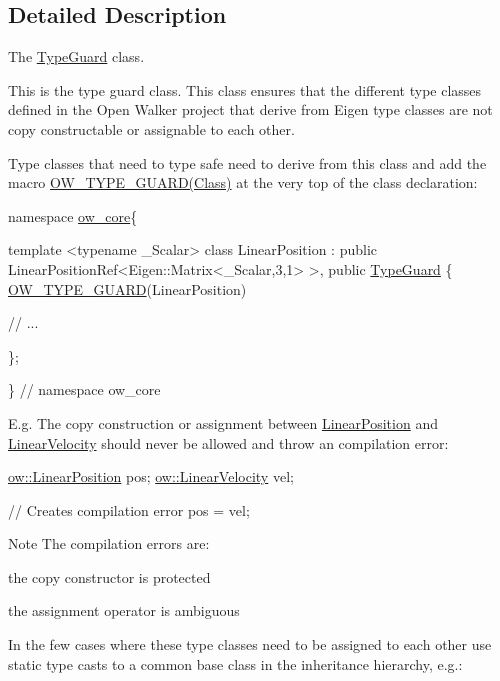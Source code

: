 \subsection{Detailed Description}
The \hyperlink{classow__core_1_1TypeGuard}{Type\+Guard} class. 

This is the type guard class. This class ensures that the different type classes defined in the Open Walker project that derive from Eigen type classes are not copy constructable or assignable to each other.

Type classes that need to type safe need to derive from this class and add the macro \hyperlink{type__guard_8h_a7eacb7a60e092553b55c91890bc1a641}{O\+W\+\_\+\+T\+Y\+P\+E\+\_\+\+G\+U\+A\+R\+D(\+Class)} at the very top of the class declaration\+:


\begin{DoxyCode}
\textcolor{keyword}{namespace }\hyperlink{namespaceow__core}{ow\_core}\{

\textcolor{keyword}{template} <\textcolor{keyword}{typename} \_Scalar>
\textcolor{keyword}{class }LinearPosition :
    \textcolor{keyword}{public} LinearPositionRef<Eigen::Matrix<\_Scalar,3,1> >,
    \textcolor{keyword}{public} \hyperlink{classow__core_1_1TypeGuard_a66a5c5d64c63c4a6585a7fc15238fe7e}{TypeGuard}
\{
  \hyperlink{type__guard_8h_a7eacb7a60e092553b55c91890bc1a641}{OW\_TYPE\_GUARD}(LinearPosition)

  \textcolor{comment}{// ...}

\};

\} \textcolor{comment}{// namespace ow\_core}
\end{DoxyCode}


E.\+g. The copy construction or assignment between \hyperlink{classow__core_1_1LinearPosition}{Linear\+Position} and \hyperlink{classow__core_1_1LinearVelocity}{Linear\+Velocity} should never be allowed and throw an compilation error\+:


\begin{DoxyCode}
\hyperlink{classow__core_1_1LinearPosition}{ow::LinearPosition} pos;
\hyperlink{classow__core_1_1LinearVelocity}{ow::LinearVelocity} vel;

\textcolor{comment}{// Creates compilation error}
pos = vel;
\end{DoxyCode}


\begin{DoxyNote}{Note}
The compilation errors are\+:
\begin{DoxyItemize}
\item the copy constructor is protected
\item the assignment operator is ambiguous
\end{DoxyItemize}
\end{DoxyNote}
In the few cases where these type classes need to be assigned to each other use static type casts to a common base class in the inheritance hierarchy, e.\+g.\+:


